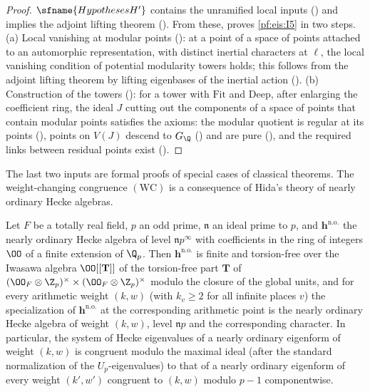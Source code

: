 \begin{proof}
$\sfname{HypothesesH'}$ contains the unramified local inputs ()
and implies the adjoint lifting theorem (). From these,
 proves \ref{pf:eis:I5} in two steps.
(a) Local vanishing at modular points (): at a point of a space of points attached to an
automorphic representation, with distinct inertial characters at $\ell$, the local vanishing condition of potential modularity towers holds;
this follows from the adjoint lifting theorem by lifting eigenbases of the inertial action ().
(b) Construction of the towers (): for a tower with
$\mathrm{Fit}$ and $\mathrm{Deep}$, after enlarging the coefficient ring, the ideal $J$ cutting out the components of a space of points that
contain modular points satisfies the axioms: the modular quotient is regular at its points
(), points on $V(J)$ descend to $G_\Q$
() and are pure (), and the required links between
residual points exist ().
\end{proof}

The last two inputs are formal proofs of special cases of classical theorems. The weight-changing congruence $(\mathrm{WC})$ is a
consequence of Hida's theory of nearly ordinary Hecke algebras.

\begin{littheorem}\label{pf:eis:hida}
Let $F$ be a totally real field, $p$ an odd prime, $\mathfrak n$ an ideal prime to $p$, and $\mathbf h^{\mathrm{n.o.}}$ the nearly ordinary Hecke algebra
of level $\mathfrak np^\infty$ with coefficients in the ring of integers $\OO$ of a finite extension of $\Q_p$. Then $\mathbf h^{\mathrm{n.o.}}$ is finite and
torsion-free over the Iwasawa algebra $\OO[[\mathbf T]]$ of the torsion-free part $\mathbf T$ of $(\OO_F\otimes\Z_p)^\times\times(\OO_F\otimes\Z_p)^\times$ modulo the
closure of the global units, and for every arithmetic weight $(k,w)$ (with $k_v\ge2$ for all infinite places $v$) the specialization of
$\mathbf h^{\mathrm{n.o.}}$ at the corresponding arithmetic point is the nearly ordinary Hecke algebra of weight $(k,w)$, level $\mathfrak np$ and the
corresponding character. In particular, the system of Hecke eigenvalues of a nearly ordinary eigenform of weight $(k,w)$ is congruent
modulo the maximal ideal (after the standard normalization of the $U_p$-eigenvalues) to that of a nearly ordinary eigenform of every weight
$(k',w')$ congruent to $(k,w)$ modulo $p-1$ componentwise.
\end{littheorem}

